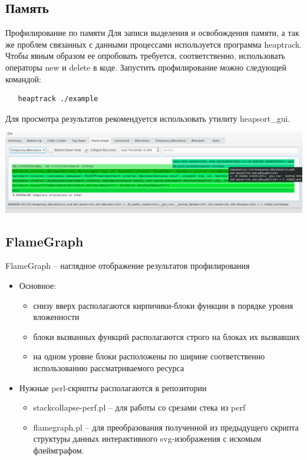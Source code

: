 \subsection{Память}
\begin{frame}[fragile]{Профилирование по памяти}
	Для записи выделения и освобождения памяти, а так же проблем связанных с данными процессами используется программа heaptrack. Чтобы явным образом ее опробовать требуется, соответственно, использовать операторы new и delete в коде. Запустить профилирование можно следующей командой:
\begin{lstlisting}
   heaptrack ./example
\end{lstlisting}
	Для просмотра результатов рекомендуется использовать утилиту heapsort\_gui.
	\begin{center}
		\includegraphics[width=.9\textwidth]{img/heaptrack_gui.png}
	\end{center}
\end{frame}

\subsection{FlameGraph}
\begin{frame}{FlameGraph -- наглядное отображение результатов профилирования}
	\begin{itemize}
		\item Основное:
		\begin{itemize}
			\item снизу вверх располагаются кирпичики-блоки функции в порядке уровня вложенности
			\item блоки вызванных функций располагаются строго на блоках их вызвавших
			\item на одном уровне блоки расположены по ширине соответственно использованию рассматриваемого ресурса
		\end{itemize}
		\item Нужные perl-скрипты располагаются в репозитории \href{https://github.com/brendangregg/FlameGraph}{}
		\begin{itemize}
			\item stackcollapse-perf.pl -- для работы со срезами стека из perf
			\item flamegraph.pl -- для преобразования полученной из предыдущего скрипта структуры данных интерактивного svg-изображения с искомым флеймграфом.
		\end{itemize}
	\end{itemize}
\end{frame}

